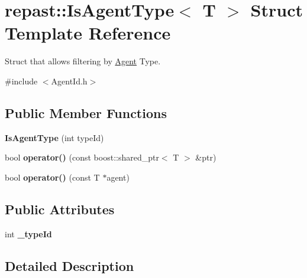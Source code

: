 \hypertarget{structrepast_1_1_is_agent_type}{\section{repast\-:\-:Is\-Agent\-Type$<$ T $>$ Struct Template Reference}
\label{structrepast_1_1_is_agent_type}
}


Struct that allows filtering by \hyperlink{classrepast_1_1_agent}{Agent} Type.  




{\ttfamily \#include $<$Agent\-Id.\-h$>$}

\subsection*{Public Member Functions}
\begin{DoxyCompactItemize}
\item 
\hypertarget{structrepast_1_1_is_agent_type_a9da2d4d5b5ec3be54e01ac6849f1cb42}{{\bfseries Is\-Agent\-Type} (int type\-Id)}\label{structrepast_1_1_is_agent_type_a9da2d4d5b5ec3be54e01ac6849f1cb42}

\item 
\hypertarget{structrepast_1_1_is_agent_type_a66d0e0e92abd3a129c739dac0b1f40eb}{bool {\bfseries operator()} (const boost\-::shared\-\_\-ptr$<$ T $>$ \&ptr)}\label{structrepast_1_1_is_agent_type_a66d0e0e92abd3a129c739dac0b1f40eb}

\item 
\hypertarget{structrepast_1_1_is_agent_type_a2eccc7a054094a2702307032462b1907}{bool {\bfseries operator()} (const T $\ast$agent)}\label{structrepast_1_1_is_agent_type_a2eccc7a054094a2702307032462b1907}

\end{DoxyCompactItemize}
\subsection*{Public Attributes}
\begin{DoxyCompactItemize}
\item 
\hypertarget{structrepast_1_1_is_agent_type_ad72641323f727069fe4a1b5a07d15ec4}{int {\bfseries \-\_\-type\-Id}}\label{structrepast_1_1_is_agent_type_ad72641323f727069fe4a1b5a07d15ec4}

\end{DoxyCompactItemize}


\subsection{Detailed Description}
